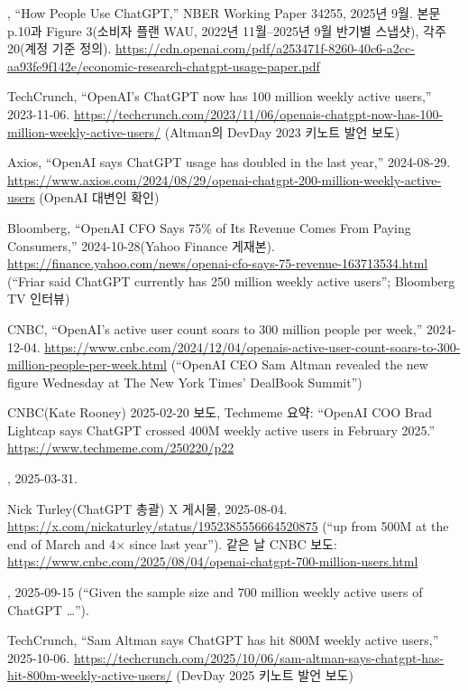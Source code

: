 \documentclass[11pt]{article}
\begin{document}
{\small
\begin{description}[leftmargin=2.6em,labelwidth=2.2em,font=\normalfont]
  \item[{[S1]}] \textcite{chatterji-2025-how-people-use-chatgpt}, ``How People Use ChatGPT,'' NBER Working Paper 34255, 2025년 9월. 본문 p.10과 Figure 3(소비자 플랜 WAU, 2022년 11월--2025년 9월 반기별 스냅샷), 각주 20(계정 기준 정의). \url{https://cdn.openai.com/pdf/a253471f-8260-40c6-a2cc-aa93fe9f142e/economic-research-chatgpt-usage-paper.pdf}
  \item[{[S2]}] TechCrunch, ``OpenAI's ChatGPT now has 100 million weekly active users,'' 2023-11-06. \url{https://techcrunch.com/2023/11/06/openais-chatgpt-now-has-100-million-weekly-active-users/} (Altman의 DevDay 2023 키노트 발언 보도)
  \item[{[S3]}] Axios, ``OpenAI says ChatGPT usage has doubled in the last year,'' 2024-08-29. \url{https://www.axios.com/2024/08/29/openai-chatgpt-200-million-weekly-active-users} (OpenAI 대변인 확인)
  \item[{[S4]}] Bloomberg, ``OpenAI CFO Says 75\% of Its Revenue Comes From Paying Consumers,'' 2024-10-28(Yahoo Finance 게재본). \url{https://finance.yahoo.com/news/openai-cfo-says-75-revenue-163713534.html} (``Friar said ChatGPT currently has 250 million weekly active users''; Bloomberg TV 인터뷰)
  \item[{[S5]}] CNBC, ``OpenAI's active user count soars to 300 million people per week,'' 2024-12-04. \url{https://www.cnbc.com/2024/12/04/openais-active-user-count-soars-to-300-million-people-per-week.html} (``OpenAI CEO Sam Altman revealed the new figure Wednesday at The New York Times' DealBook Summit'')
  \item[{[S6]}] CNBC(Kate Rooney) 2025-02-20 보도, Techmeme 요약: ``OpenAI COO Brad Lightcap says ChatGPT crossed 400M weekly active users in February 2025.'' \url{https://www.techmeme.com/250220/p22}
  \item[{[S7]}] \textcite{openai-2025-new-funding-agi}, 2025-03-31.
  \item[{[S8]}] Nick Turley(ChatGPT 총괄) X 게시물, 2025-08-04. \url{https://x.com/nickaturley/status/1952385556664520875} (``up from 500M at the end of March and 4$\times$ since last year''). 같은 날 CNBC 보도: \url{https://www.cnbc.com/2025/08/04/openai-chatgpt-700-million-users.html}
  \item[{[S9]}] \textcite{openai-2025-how-people-are-using-chatgpt}, 2025-09-15 (``Given the sample size and 700 million weekly active users of ChatGPT \ldots'').
  \item[{[S10]}] TechCrunch, ``Sam Altman says ChatGPT has hit 800M weekly active users,'' 2025-10-06. \url{https://techcrunch.com/2025/10/06/sam-altman-says-chatgpt-has-hit-800m-weekly-active-users/} (DevDay 2025 키노트 발언 보도)

\end{description}}
\end{document}
